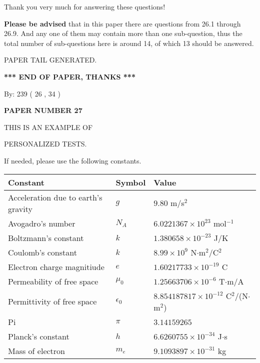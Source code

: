 \documentclass[12pt]{article}
\begin{document}
Thank you very much for answering these questions!
 
{\textbf{\large{Please be advised}}} that in this paper there are questions from
26.1 through
26.9.
And any one of them may contain more than one sub-question, thus the total number
of sub-questions here is around 14, of which
13 should be answered.
 
   
   
\vspace{2.0in} PAPER TAIL GENERATED.
   
   
   
   
\vspace{1.0in} 
{\textbf{\large{ *** END OF PAPER, THANKS *** }}} 
   
   
\hspace{1.0in} By: 
         239 (          26 ,           34 )
   
   
   
   
\newpage 
\setcounter{page}{ 
    27001 } 
   
   
   
   
 {\textbf{ \Large{ PAPER NUMBER           27  }}}
   
   
\vspace{0.2in}
   
   
   
   
   
   
   
   
 \vspace{0.2in}
 
 
{\Huge  THIS IS AN EXAMPLE OF}
 
{\Huge  PERSONALIZED TESTS. }
 
If needed, please use the following constants.
 
 
 
\noindent\begin{tabular}{|l|l|l|}
\hline
Constant & Symbol & Value \\
\hline
Acceleration due to earth's gravity &
$g$ &
 $ 9.80 $
m/s$^2$ \\
\hline
Avogadro's number &
$N_A$ &
 $ 6.0221367 \times 10^{23} $
mol$^{-1}$ \\
\hline
Boltzmann's constant &
$k$ &
 $ 1.380658 \times 10^{-23} $
J/K \\
\hline
Coulomb's constant &
$k$ &
 $ 8.99 \times 10^{9} $
N$\cdot $m$^2$/C$^2$ \\
\hline
Electron charge magnitiude &
$e$ &
 $ 1.60217733 \times 10^{-19} $
C \\
\hline
Permeability of free space &
$\mu _0$ &
 $ 1.25663706 \times 10^{-6} $
T$\cdot $m/A \\
\hline
Permittivity of free space &
$\epsilon _0$ &
 $ 8.854187817 \times 10^{-12} $
C$^2$/(N$\cdot $m$^2$) \\
\hline
Pi &
$\pi$ &
 $ 3.14159265 $
$ $ \\
\hline
Planck's constant &
$h$ &
 $ 6.6260755 \times 10^{-34} $
J$\cdot $s \\
\hline
Mass of electron &
$m_e$ &
 $ 9.1093897 \times 10^{-31} $
kg \\
\hline
\end{tabular}
 
\end{document}
